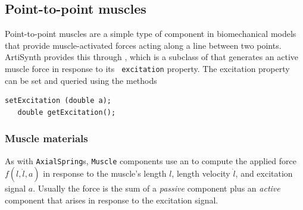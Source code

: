 
%
%


\subsection{Point-to-point muscles}
\label{PointToPointMuscles:sec}

Point-to-point muscles are a simple type of component in biomechanical
models that provide muscle-activated forces acting along a line
between two points. ArtiSynth provides this through
, which is a subclass of
 that generates an
active muscle force in response to its {\tt
excitation} property. The excitation property can be set and queried
using the methods
%
\begin{lstlisting}[]
   setExcitation (double a);
   double getExcitation();
\end{lstlisting}
%

\subsubsection{Muscle materials}

As with {\tt AxialSpring}s, {\tt Muscle} components use an
 to compute the
applied force $f (l, \dot l, a)$ in response to the muscle's length
$l$, length velocity $\dot l$, and excitation signal $a$.  Usually the
force is the sum of a {\it passive} component plus an {\it active}
component that arises in response to the excitation signal.

